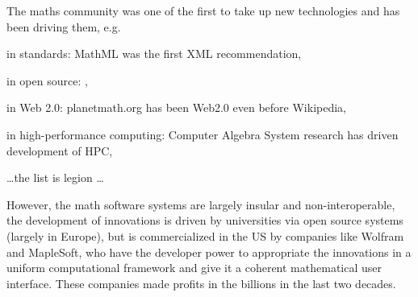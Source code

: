 \documentclass[noworkareas,deliverables,keys]{euproposal}                  %
\begin{document}
\begin{proposal}
The maths community was one of the first to take up new technologies and has been driving
them, e.g.
\begin{compactenum}[\em i)\rm]
\item in standards: MathML was the first XML recommendation,
\item in open source: ,
\item in Web 2.0: planetmath.org has been Web2.0 even before Wikipedia,
\item in high-performance computing: Computer Algebra System research has driven development of HPC,
\item \ldots the list is legion \ldots
\end{compactenum}

However, the math software systems are largely insular and
non-interoperable, the development of innovations is driven by
universities via open source systems (largely in Europe), but is
commercialized in the US by companies like Wolfram and MapleSoft, who
have the developer power to appropriate the innovations in a uniform
computational framework and give it a coherent mathematical user
interface. These companies made profits in the billions in the last
two decades.


\end{proposal}
\end{document}
